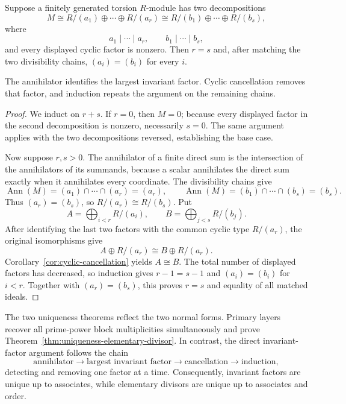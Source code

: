 \begin{theorem}
\label{thm:uniqueness-invariant-factor}
Suppose a finitely generated torsion \(R\)-module has two decompositions
\[
M\cong R/(a_1)\oplus\cdots\oplus R/(a_r)
\cong R/(b_1)\oplus\cdots\oplus R/(b_s),
\]
where
\[
a_1\mid\cdots\mid a_r,
\qquad b_1\mid\cdots\mid b_s,
\]
and every displayed cyclic factor is nonzero. Then \(r=s\) and, after
matching the two divisibility chains, \((a_i)=(b_i)\) for every \(i\).
\end{theorem}
\begin{proofidea}
The annihilator identifies the largest invariant factor. Cyclic cancellation
removes that factor, and induction repeats the argument on the remaining
chains.
\end{proofidea}
\begin{proof}
We induct on \(r+s\). If \(r=0\), then \(M=0\); because every displayed
factor in the second decomposition is nonzero, necessarily \(s=0\). The same
argument applies with the two decompositions reversed, establishing the base
case.

Now suppose \(r,s>0\). The annihilator of a finite direct sum is the
intersection of the annihilators of its summands, because a scalar
annihilates the direct sum exactly when it annihilates every coordinate. The
divisibility chains give
\[
\operatorname{Ann}(M)
=(a_1)\cap\cdots\cap(a_r)=(a_r),
\qquad
\operatorname{Ann}(M)
=(b_1)\cap\cdots\cap(b_s)=(b_s).
\]
Thus \((a_r)=(b_s)\), so \(R/(a_r)\cong R/(b_s)\). Put
\[
A=\bigoplus_{i<r}R/(a_i),
\qquad
B=\bigoplus_{j<s}R/(b_j).
\]
After identifying the last two factors with the common cyclic type
\(R/(a_r)\), the original isomorphisms give
\[
A\oplus R/(a_r)\cong B\oplus R/(a_r).
\]
Corollary~\ref{cor:cyclic-cancellation} yields \(A\cong B\). The total number
of displayed factors has decreased, so induction gives \(r-1=s-1\) and
\((a_i)=(b_i)\) for \(i<r\). Together with \((a_r)=(b_s)\), this proves
\(r=s\) and equality of all matched ideals.
\end{proof}

The two uniqueness theorems reflect the two normal forms. Primary layers
recover all prime-power block multiplicities simultaneously and prove
Theorem~\ref{thm:uniqueness-elementary-divisor}. In contrast, the direct
invariant-factor argument follows the chain
\[
\text{annihilator}\longrightarrow\text{largest invariant factor}
\longrightarrow\text{cancellation}\longrightarrow\text{induction},
\]
detecting and removing one factor at a time. Consequently, invariant factors
are unique up to associates, while elementary divisors are unique up to
associates and order.

